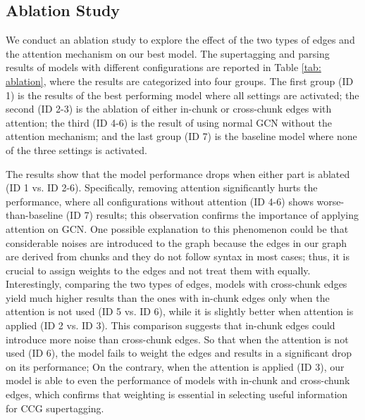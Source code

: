 \documentclass[11pt,a4paper]{article}
\begin{document}
\subsection{Ablation Study}




We conduct an ablation study to explore the effect of the two types of edges and the attention mechanism on our best model.
The supertagging and parsing results of models with different configurations are reported in Table \ref{tab: ablation},
where the results are categorized into four groups.
The first group (ID 1) is the results of the best performing model where all settings are activated;
the second (ID 2-3) is the ablation of either in-chunk or cross-chunk edges with attention;
the third (ID 4-6) is the result of using normal GCN without the attention mechanism;
and the last group (ID 7) is the baseline model where none of the three settings is activated.


The results show that the model performance drops when either part is ablated (ID 1 vs. ID 2-6).
Specifically,
removing attention 
significantly hurts the performance, where all configurations without attention (ID 4-6) shows worse-than-baseline (ID 7) results; this observation confirms the importance of applying attention on GCN.
One possible explanation to this phenomenon could be that considerable noises are introduced to the graph because the edges in our graph are derived from chunks and they do not follow syntax in most cases;
thus, it is crucial to assign weights to the edges and not treat them with equally.
Interestingly, comparing the two types of edges, models with cross-chunk edges yield much higher results
than the ones with in-chunk edges only when the attention is not used (ID 5 vs. ID 6),
while it is slightly better when attention is applied (ID 2 vs. ID 3).
This comparison suggests that in-chunk edges could introduce more noise than cross-chunk edges.
So that
when the attention is not used (ID 6), the model fails to weight the edges and results in a significant drop on its performance;
On the contrary, when the attention is applied (ID 3),
our model is able to even the performance of models with in-chunk and cross-chunk edges, which confirms that weighting is essential in selecting useful information for CCG supertagging.
\end{document}
